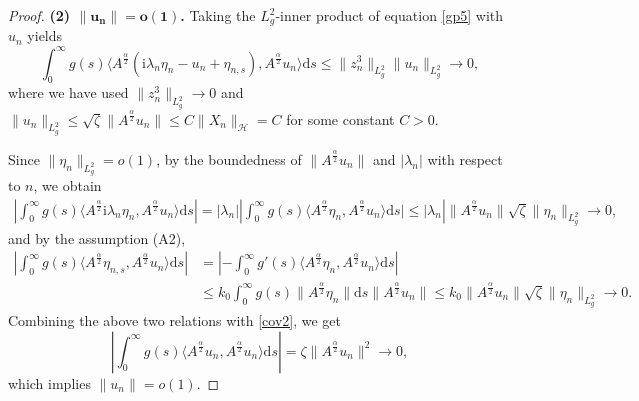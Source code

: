 \documentclass[10pt,a4paper]{amsart}
\begin{document}
\begin{proof}
		{\bf \noindent(2) $\bm{\|u_n\|=o(1)}$.}
		Taking the $L_g^2$-inner product of equation \eqref{gp5} with $u_n$ yields
		\begin{equation}\label{cov2}
			\int_{0}^{\infty} g(s)\langle A^{\frac{\alpha}{2}}(\mathrm{i}\lambda_{n}\eta_{n}-u_{n}+\eta_{n,s}),A^{\frac{\alpha}{2}}u_{n}\rangle\mathrm{d}s \le\|z^3_n\|_{L^2_g}\|u_n\|_{L^2_g}\to 0,
		\end{equation}
		where we have used $\|z^3_n\|_{L^2_g}\to0$ and $\|u_n\|_{L^2_g}\le\sqrt\zeta\|A^{\frac\alpha2}u_n\|\le C\|X_n\|_{\mathcal{H}}=C$ for some constant $C>0$.
		
		Since $\|\eta_n\|_{L_g^2} =o(1)$, by the boundedness of $\| A^{\frac{\alpha}{2}} u_n \|$ and $|\lambda_n|$ with respect to $n$, we obtain
		\begin{align*}
			\left|\int_{0}^{\infty} g(s)\langle A^{\frac{\alpha}{2}}\mathrm{i}\lambda_{n}\eta_{n},A^{\frac{\alpha}{2}}u_{n}\rangle\mathrm{d}s\right|= |\lambda_{n}|\left|\int_{0}^{\infty} g(s)\langle A^{\frac{\alpha}{2}}\eta_{n},A^{\frac{\alpha}{2}}u_{n}\rangle\mathrm{d}s| \leq |\lambda_{n}\right| \|A^{\frac{\alpha}{2}}u_{n}\|  \sqrt{\zeta} \|\eta_{n}\|_{L_{g}^{2}} \to 0,
		\end{align*}
		and by the assumption (A2),
		\begin{align*}
			\left|\int_{0}^{\infty} g(s)\langle A^{\frac{\alpha}{2}}\eta_{n,s},A^{\frac{\alpha}{2}}u_{n}\rangle\mathrm{d}s\right|&= \left|-\int_{0}^{\infty} g'(s)\langle A^{\frac{\alpha}{2}}\eta_{n},A^{\frac{\alpha}{2}}u_{n}\rangle\mathrm{d}s\right| \\
			&\leq k_{0}\int_{0}^{\infty} g(s)\|A^{\frac{\alpha}{2}}\eta_{n}\|\mathrm{d}s \|A^{\frac{\alpha}{2}}u_{n}\| \leq k_{0}\|A^{\frac{\alpha}{2}}u_{n}\|\sqrt{\zeta}\|\eta_{n}\|_{L_{g}^{2}} \to 0.
		\end{align*}
		Combining the above two relations with 	\eqref{cov2}, we get
		\[
		\left|\int_{0}^{\infty} g(s)\langle A^{\frac{\alpha}{2}}u_{n},A^{\frac{\alpha}{2}}u_{n}\rangle\mathrm{d}s\right|
		= \zeta\|A^{\frac{\alpha}{2}}u_{n}\|^{2}\to0,
		\]
		which implies $\|u_n\|=o(1)$.
		

\end{proof}
\end{document}
